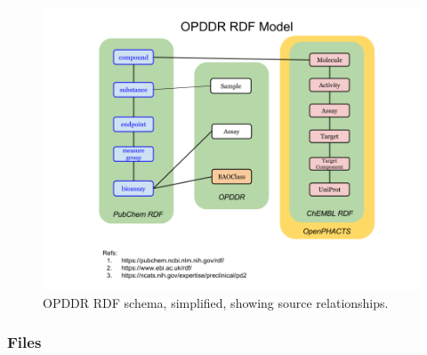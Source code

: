 \begin{figure}
    \centering
    \includegraphics[width=\linewidth]{figures/opddr/OPDDR_schema.png}
    \caption{OPDDR RDF schema, simplified, showing source relationships.}
    \label{fig:opddr_01}
\end{figure}

\subsubsection{Files}

